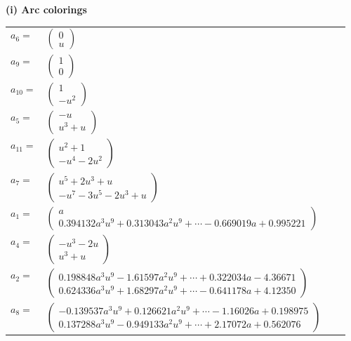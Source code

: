 \documentclass[1p]{elsarticle_modified}
\theoremstyle{definition}
\begin{document}
\flushleft \textbf{(i) Arc colorings}\\
\begin{tabular}{m{7pt} m{180pt} m{7pt} m{180pt} }
\flushright $a_{6}=$&$\begin{pmatrix}0\\u\end{pmatrix}$ \\
\flushright $a_{9}=$&$\begin{pmatrix}1\\0\end{pmatrix}$ \\
\flushright $a_{10}=$&$\begin{pmatrix}1\\- u^2\end{pmatrix}$ \\
\flushright $a_{5}=$&$\begin{pmatrix}- u\\u^3+u\end{pmatrix}$ \\
\flushright $a_{11}=$&$\begin{pmatrix}u^2+1\\- u^4-2 u^2\end{pmatrix}$ \\
\flushright $a_{7}=$&$\begin{pmatrix}u^5+2 u^3+u\\- u^7-3 u^5-2 u^3+u\end{pmatrix}$ \\
\flushright $a_{1}=$&$\begin{pmatrix}a\\0.394132 a^{3} u^{9}+0.313043 a^{2} u^{9}+\cdots-0.669019 a+0.995221\end{pmatrix}$ \\
\flushright $a_{4}=$&$\begin{pmatrix}- u^3-2 u\\u^3+u\end{pmatrix}$ \\
\flushright $a_{2}=$&$\begin{pmatrix}0.198848 a^{3} u^{9}-1.61597 a^{2} u^{9}+\cdots+0.322034 a-4.36671\\0.624336 a^{3} u^{9}+1.68297 a^{2} u^{9}+\cdots-0.641178 a+4.12350\end{pmatrix}$ \\
\flushright $a_{8}=$&$\begin{pmatrix}-0.139537 a^{3} u^{9}+0.126621 a^{2} u^{9}+\cdots-1.16026 a+0.198975\\0.137288 a^{3} u^{9}-0.949133 a^{2} u^{9}+\cdots+2.17072 a+0.562076\end{pmatrix}$ \\

\end{tabular}
\end{document}
